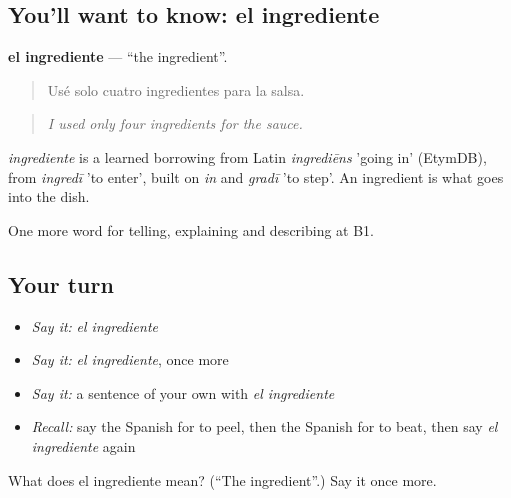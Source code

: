 \subsection*{You'll want to know: el ingrediente}
\textbf{el ingrediente} — \textquotedblleft{}the ingredient\textquotedblright{}.

\begin{quote}
Usé solo cuatro ingredientes para la salsa.
\end{quote}

\begin{quote}
\emph{I used only four ingredients for the sauce.}
\end{quote}

\begin{cousinweb}
\emph{ingrediente} is a learned borrowing from Latin \emph{ingrediēns} 'going in' (EtymDB), from \emph{ingredī} 'to enter', built on \emph{in} and \emph{gradī} 'to step'. An ingredient is what goes into the dish.
\end{cousinweb}

\begin{grammarlens}[title={What you've built}]
One more word for telling, explaining and describing at B1.
\end{grammarlens}

\subsection*{Your turn}
\begin{itemize}
\raggedright
  \item \emph{Say it:} \emph{el ingrediente}
  \item \emph{Say it:} \emph{el ingrediente}, once more
  \item \emph{Say it:} a sentence of your own with \emph{el ingrediente}
  \item \emph{Recall:} say the Spanish for to peel, then the Spanish for to beat, then say \emph{el ingrediente} again
\end{itemize}

\begin{tcolorbox}[breakable,colback=teal!4,colframe=teal!35!black,title={Before you move on}]
What does el ingrediente mean? (\textquotedblleft{}The ingredient\textquotedblright{}.) Say it once more.
\end{tcolorbox}
